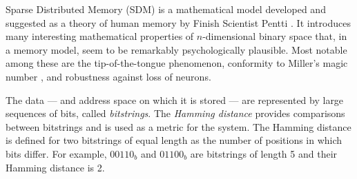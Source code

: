 
Sparse Distributed Memory (SDM) is a mathematical model developed and suggested as a theory of human memory by Finish Scientist Pentti \citet{Kanerva1988}. It introduces many interesting mathematical properties of $n$-dimensional binary space that, in a memory model, seem to be remarkably psychologically plausible.  Most notable among these are the tip-of-the-tongue phenomenon, conformity to Miller's magic number \citep{Linhares2011}, and robustness against loss of neurons.

The data --- and address space on which it is stored --- are represented by large sequences of bits, called \emph{bitstrings}. The \emph{Hamming distance} provides comparisons between bitstrings and is used as a metric for the system. The Hamming distance is defined for two bitstrings of equal length as the number of positions in which bits differ. For example, $00110_{b}$ and $01100_{b}$ are bitstrings of length 5 and their Hamming distance is 2.

